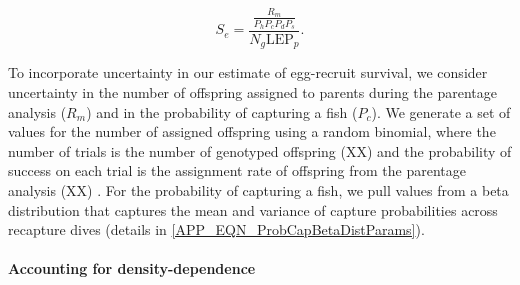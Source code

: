 \documentclass[12pt, oneside]{article}   	%
\begin{document}
\begin{equation}
S_e = \frac{\frac{R_m}{P_h P_c P_d P_s}}{N_g \text{LEP}_p}. \label{EQN_EggRecruitSurv}
\end{equation}

To incorporate uncertainty in our estimate of egg-recruit survival, we consider uncertainty in the number of offspring assigned to parents during the parentage analysis ($R_m$) and in the probability of capturing a fish ($P_c$). We generate a set of values for the number of assigned offspring using a random binomial, where the number of trials is the number of genotyped offspring (XX) and the probability of success on each trial is the assignment rate of offspring from the parentage analysis (XX) \citep{catalanoInPrepconnectivity}. For the probability of capturing a fish, we pull values from a beta distribution that captures the mean and variance of capture probabilities across recapture dives (details in \ref{APP_EQN_ProbCapBetaDistParams}).


\paragraph*{Accounting for density-dependence}  %
\end{document}
